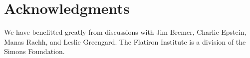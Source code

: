 \documentclass[10pt]{article}
\begin{document}
\section*{Acknowledgments}
We have benefitted greatly from discussions with Jim Bremer, Charlie Epstein,
Manas Rachh, and Leslie Greengard.
The Flatiron Institute is a division of the Simons Foundation.













\end{document}
